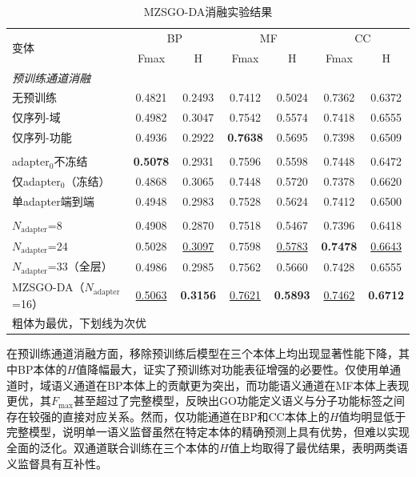 \begin{table}[htbp]
\centering
\caption{MZSGO-DA消融实验结果}
\label{tab:mzsgo_da_ablation}
\small
\begin{tabular}{l cc cc cc}
\toprule
\multirow{2}{*}{变体} & \multicolumn{2}{c}{BP} & \multicolumn{2}{c}{MF} & \multicolumn{2}{c}{CC} \\
 & Fmax & H & Fmax & H & Fmax & H \\
\midrule
\multicolumn{7}{l}{\textit{预训练通道消融}} \\
无预训练 & 0.4821 & 0.2493 & 0.7412 & 0.5024 & 0.7362 & 0.6372 \\
仅序列-域 & 0.4982 & 0.3047 & 0.7542 & 0.5574 & 0.7418 & 0.6555 \\
仅序列-功能 & 0.4936 & 0.2922 & \textbf{0.7638} & 0.5695 & 0.7398 & 0.6509 \\
\addlinespace[5pt]
\multicolumn{7}{l}{\textit{适配器策略消融}} \\
adapter$_0$不冻结 & \textbf{0.5078} & 0.2931 & 0.7596 & 0.5598 & 0.7448 & 0.6472 \\
仅adapter$_0$（冻结） & 0.4868 & 0.3065 & 0.7448 & 0.5720 & 0.7378 & 0.6620 \\
单adapter端到端 & 0.4948 & 0.2983 & 0.7528 & 0.5624 & 0.7412 & 0.6500 \\
\addlinespace[5pt]
\multicolumn{7}{l}{\textit{注入层数消融}} \\
$N_{\text{adapter}}$=8 & 0.4908 & 0.2870 & 0.7518 & 0.5467 & 0.7396 & 0.6418 \\
$N_{\text{adapter}}$=24 & 0.5028 & \underline{0.3097} & 0.7598 & \underline{0.5783} & \textbf{0.7478} & \underline{0.6643} \\
$N_{\text{adapter}}$=33（全层） & 0.4986 & 0.2985 & 0.7562 & 0.5660 & 0.7428 & 0.6555 \\
\addlinespace[5pt]
MZSGO-DA（$N_{\text{adapter}}$=16） & \underline{0.5063} & \textbf{0.3156} & \underline{0.7621} & \textbf{0.5893} & \underline{0.7462} & \textbf{0.6712} \\
\bottomrule
\multicolumn{7}{l}{\vspace{0.2em}\footnotesize 粗体为最优，下划线为次优} \\
\end{tabular}
\end{table}

在预训练通道消融方面，移除预训练后模型在三个本体上均出现显著性能下降，其中BP本体的$H$值降幅最大，证实了预训练对功能表征增强的必要性。仅使用单通道时，域语义通道在BP本体上的贡献更为突出，而功能语义通道在MF本体上表现更优，其$F_{\max}$甚至超过了完整模型，反映出GO功能定义语义与分子功能标签之间存在较强的直接对应关系。然而，仅功能通道在BP和CC本体上的$H$值均明显低于完整模型，说明单一语义监督虽然在特定本体的精确预测上具有优势，但难以实现全面的泛化。双通道联合训练在三个本体的$H$值上均取得了最优结果，表明两类语义监督具有互补性。

